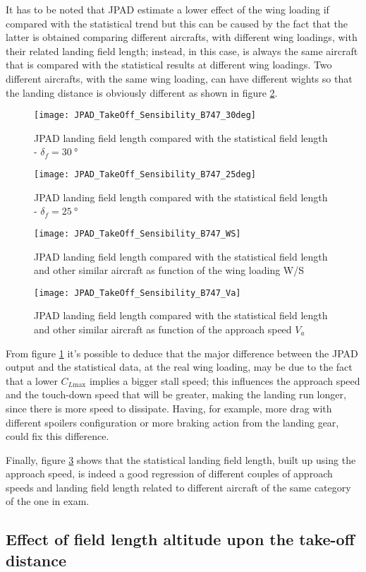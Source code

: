 \bigskip
\noindent
It has to be noted that \gls{JPAD} estimate a lower effect of the wing loading if compared with the statistical trend but this can be caused by the fact that the latter is obtained comparing different aircrafts, with different wing loadings, with their related landing field length; instead, in this case, is always the same aircraft that is compared with the statistical results at different wing loadings. Two different aircrafts, with the same wing loading, can have different wights so that the landing distance is obviously different as shown in figure \ref{fig:LandingWSAircraft}.
%
\clearpage
%
\begin{figure}[H]
\centering
\texttt{[image: JPAD\_TakeOff\_Sensibility\_B747\_30deg]}
\caption{\gls{JPAD} landing field length compared with the statistical field length - $\delta_f=\SI{30}{\degree}$}
\end{figure}
%
\begin{figure}[H]
\centering
\texttt{[image: JPAD\_TakeOff\_Sensibility\_B747\_25deg]}
\caption{\gls{JPAD} landing field length compared with the statistical field length - $\delta_f=\SI{25}{\degree}$}
\label{fig:LandingWS25}
\end{figure}
%
\begin{figure}[H]
\centering
\texttt{[image: JPAD\_TakeOff\_Sensibility\_B747\_WS]}
\caption{\gls{JPAD} landing field length compared with the statistical field length and other similar aircraft as function of the wing loading W/S}
\label{fig:LandingWSAircraft}
\end{figure}
%
\begin{figure}[H]
\centering
\texttt{[image: JPAD\_TakeOff\_Sensibility\_B747\_Va]}
\caption{\gls{JPAD} landing field length compared with the statistical field length and other similar aircraft as function of the approach speed $V_a$}
\label{fig:LandingVa}
\end{figure}
%
\clearpage
%
\noindent
From figure \ref{fig:LandingWS25} it's possible to deduce that the major difference between the \gls{JPAD} output and the statistical data, at the real wing loading, may be due to the fact that a lower $C_{L\text{max}}$ implies a bigger stall speed; this influences the approach speed and the touch-down speed that will be greater, making the landing run longer, since there is more speed to dissipate. Having, for example, more drag with different spoilers configuration or more braking action from the landing gear, could fix this difference.

\bigskip
\noindent
Finally, figure \ref{fig:LandingVa} shows that the statistical landing field length, built up using the approach speed, is indeed a good regression of different couples of approach speeds and landing field length related to different aircraft of the same category of the one in exam.
%
\subsection{Effect of field length altitude upon the take-off distance}

